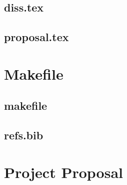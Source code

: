 \documentclass[12pt,a4paper,twoside,openright]{report}
\begin{document}
\section{diss.tex}
{\scriptsize}

\section{proposal.tex}
{\scriptsize}

\chapter{Makefile}

\section{makefile}\label{makefile}
{\scriptsize}

\section{refs.bib}
{\scriptsize}


\chapter{Project Proposal}

% 
\end{document}

